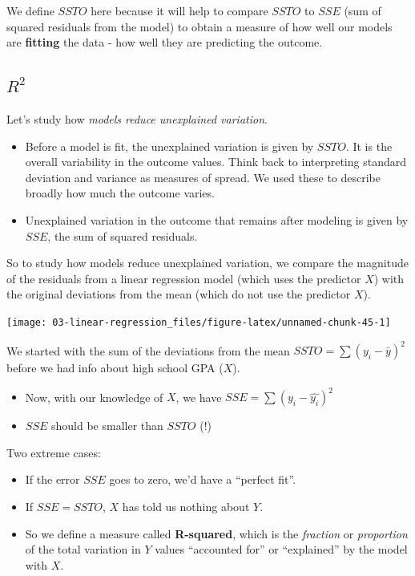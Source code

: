 \documentclass[
]{book}
\providecommand{\tightlist}{%
  \setlength{\itemsep}{0pt}\setlength{\parskip}{0pt}}
\begin{document}
We define \(SSTO\) here because it will help to compare \(SSTO\) to \(SSE\) (sum of squared residuals from the model) to obtain a measure of how well our models are \textbf{fitting} the data - how well they are predicting the outcome.

\hypertarget{r2}{%
\subsection{\texorpdfstring{\(R^2\)}{R\^{}2}}\label{r2}}

Let's study how \emph{models reduce unexplained variation}.

\begin{itemize}
\tightlist
\item
  Before a model is fit, the unexplained variation is given by \(SSTO\). It is the overall variability in the outcome values. Think back to interpreting standard deviation and variance as measures of spread. We used these to describe broadly how much the outcome varies.
\item
  Unexplained variation in the outcome that remains after modeling is given by \(SSE\), the sum of squared residuals.
\end{itemize}

So to study how models reduce unexplained variation, we compare the magnitude of the residuals from a linear regression model (which uses the predictor \(X\)) with the original deviations from the mean (which do not use the predictor \(X\)).

\begin{center}\texttt{[image: 03-linear-regression\_files/figure-latex/unnamed-chunk-45-1]} \end{center}

We started with the sum of the deviations from the mean \(SSTO = \sum{(y_i - \bar{y})^2}\) before we had info about high school GPA (\(X\)).

\begin{itemize}
\item
  Now, with our knowledge of \(X\), we have \(SSE = \sum{(y_i - \hat{y_i})^2}\)
\item
  \(SSE\) should be smaller than \(SSTO\) (!)
\end{itemize}

Two extreme cases:

\begin{itemize}
\item
  If the error \(SSE\) goes to zero, we'd have a ``perfect fit''.
\item
  If \(SSE = SSTO\), \(X\) has told us nothing about \(Y\).
\item
  So we define a measure called \textbf{R-squared}, which is the \emph{fraction} or \emph{proportion} of the total variation in \(Y\) values ``accounted for'' or ``explained'' by the model with \(X\).
\end{itemize}
\end{document}
